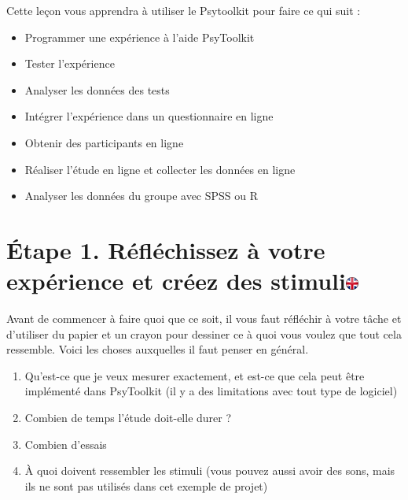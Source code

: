 \documentclass[
]{book}
\providecommand{\tightlist}{%
  \setlength{\itemsep}{0pt}\setlength{\parskip}{0pt}}
\begin{document}
Cette leçon vous apprendra à utiliser le Psytoolkit pour faire ce qui suit :

\begin{itemize}
\tightlist
\item
  Programmer une expérience à l'aide PsyToolkit
\item
  Tester l'expérience
\item
  Analyser les données des tests
\item
  Intégrer l'expérience dans un questionnaire en ligne
\item
  Obtenir des participants en ligne
\item
  Réaliser l'étude en ligne et collecter les données en ligne
\item
  Analyser les données du groupe avec SPSS ou R
\end{itemize}

\hypertarget{uxe9tape-1.-ruxe9fluxe9chissez-uxe0-votre-expuxe9rience-et-cruxe9ez-des-stimuli}{%
\section[Étape 1. Réfléchissez à votre expérience et créez des stimuli]{\texorpdfstring{Étape 1. Réfléchissez à votre expérience et créez des stimuli\href{https://www.psytoolkit.org/lessons/project.html\#_step_1_think_about_your_experiment_and_create_stimuli}{\protect\includegraphics{img/ukflag.png}}}{Étape 1. Réfléchissez à votre expérience et créez des stimuli}}\label{uxe9tape-1.-ruxe9fluxe9chissez-uxe0-votre-expuxe9rience-et-cruxe9ez-des-stimuli}}

Avant de commencer à faire quoi que ce soit, il vous faut réfléchir à votre tâche et d'utiliser du papier et un crayon pour dessiner ce à quoi vous voulez que tout cela ressemble. Voici les choses auxquelles il faut penser en général.

\begin{enumerate}
\def\labelenumi{\arabic{enumi}.}
\tightlist
\item
  Qu'est-ce que je veux mesurer exactement, et est-ce que cela peut être implémenté dans PsyToolkit (il y a des limitations avec tout type de logiciel)
\item
  Combien de temps l'étude doit-elle durer ?
\item
  Combien d'essais
\item
  À quoi doivent ressembler les stimuli (vous pouvez aussi avoir des sons, mais ils ne sont pas utilisés dans cet exemple de projet)
\end{enumerate}
\end{document}
